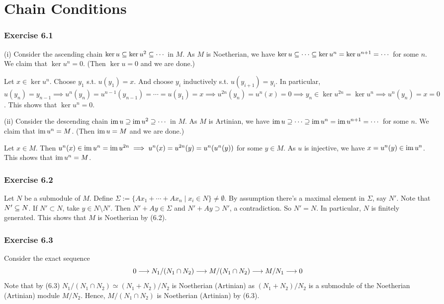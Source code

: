 \documentclass[../A&M.tex]{subfiles}
\begin{document}
\chapter{Chain Conditions}

\subsection*{Exercise 6.1}

(i) Consider the ascending chain $\ker u \subseteq \ker u^2 \subseteq \cdots$ in $M$. As $M$ is Noetherian, we have $\ker u \subseteq \cdots \subseteq \ker u^n = \ker u^{n+1} = \cdots$ for some $n$. We claim that $\ker u^n = 0$. (Then $\ker u = 0$ and we are done.)

Let $x\in\ker u^n$. Choose $y_1$ s.t. $u(y_1) = x$. And choose $y_i$ inductively s.t. $u(y_{i+1}) = y_i$. In particular, $u(y_n) = y_{n-1} \implies u^n(y_n) = u^{n-1}(y_{n-1}) = \cdots = u(y_1) = x \implies u^{2n}(y_n) = u^n(x) = 0 \implies y_n \in \ker u^{2n} = \ker u^n \implies u^n(y_n) = x = 0$. This shows that $\ker u^n = 0$.

(ii) Consider the descending chain $\operatorname{im} u \supseteq \operatorname{im} u^2 \supseteq \cdots$ in $M$. As $M$ is Artinian, we have $\operatorname{im} u \supseteq \cdots \supseteq \operatorname{im} u^n = \operatorname{im} u^{n+1} = \cdots$ for some $n$. We claim that $\operatorname{im} u^n = M$. (Then $\operatorname{im} u = M$ and we are done.)

Let $x\in M$. Then $u^n(x) \in \operatorname{im} u^n = \operatorname{im} u^{2n} \implies u^n(x) = u^{2n}(y) = u^n(u^n(y))$ for some $y\in M$. As $u$ is injective, we have $x = u^n(y) \in \operatorname{im} u^n$.  This shows that $\operatorname{im} u^n = M$.

\subsection*{Exercise 6.2}

Let $N$ be a submodule of $M$. Define $\Sigma := \{ Ax_1+\cdots+Ax_n \mid x_i \in N \} \neq \emptyset$. By assumption there's a maximal element in $\Sigma$, say $N'$. Note that $N' \subseteq N$. If $N'\subset N$, take $y \in N \setminus N'$. Then $N'+Ay \in \Sigma$ and $N'+Ay \supset N'$, a contradiction. So $N' = N$. In particular, $N$ is finitely generated. This shows that $M$ is Noetherian by (6.2).

\subsection*{Exercise 6.3}

Consider the exact sequence
$$
0 \longrightarrow N_1/(N_1\cap N_2) \longrightarrow M/(N_1\cap N_2) \longrightarrow M/N_1 \longrightarrow 0
$$
Note that by (6.3) $N_1/(N_1\cap N_2) \simeq (N_1+N_2)/N_2$ is Noetherian (Artinian) as $(N_1+N_2)/N_2$ is a submodule of the Noetherian (Artinian) module $M/N_2$. Hence, $M/(N_1\cap N_2)$ is Noetherian (Artinian) by (6.3). 
\end{document}

